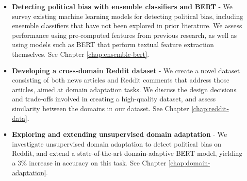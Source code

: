 \begin{itemize}
    \item \textbf{Detecting political bias with ensemble classifiers and BERT} - We survey existing machine learning models for detecting political bias, including ensemble classifiers that have not been explored in prior literature. We assess performance using pre-computed features from previous research, as well as using models such as BERT that perform textual feature extraction themselves. See Chapter \ref{chap:ensemble-bert}.
    \item \textbf{Developing a cross-domain Reddit dataset} - We create a novel dataset consisting of both news articles and Reddit comments that address those articles, aimed at domain adaptation tasks. We discuss the design decisions and trade-offs involved in creating a high-quality dataset, and assess similarity between the domains in our dataset. See Chapter \ref{chap:reddit-data}.
    \item \textbf{Exploring and extending unsupervised domain adaptation} - We investigate unsupervised domain adaptation to detect political bias on Reddit, and extend a state-of-the-art domain-adaptive BERT model, yielding a 3\% increase in accuracy on this task. See Chapter \ref{chap:domain-adaptation}.
\end{itemize}
